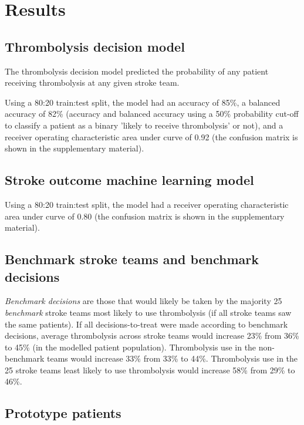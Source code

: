 \section{Results}


\subsection{Thrombolysis decision model}

The thrombolysis decision model predicted the probability of any patient receiving thrombolysis at any given stroke team.

Using a 80:20 train:test split, the model had an accuracy of 85\%, a balanced accuracy of 82\% (accuracy and balanced accuracy using a 50\% probability cut-off to classify a patient as a binary 'likely to receive thrombolysis' or not), and a receiver operating characteristic area under curve of 0.92 (the confusion matrix is shown in the supplementary material).


\subsection{Stroke outcome machine learning model}

Using a 80:20 train:test split, the model had a receiver operating characteristic area under curve of 0.80 (the confusion matrix is shown in the supplementary material).

\subsection{Benchmark stroke teams and benchmark decisions}

\textit{Benchmark decisions} are those that would likely be taken by the majority 25 \textit{benchmark} stroke teams most likely to use thrombolysis (if all stroke teams saw the same patients). If all decisions-to-treat were made according to benchmark decisions, average thrombolysis across stroke teams would increase 23\% from 36\% to 45\% (in the modelled patient population). Thrombolysis use in the non-benchmark teams would increase 33\% from 33\% to 44\%. Thrombolysis use in the 25 stroke teams least likely to use thrombolysis would increase 58\% from 29\% to 46\%.



\subsection{Prototype patients}

